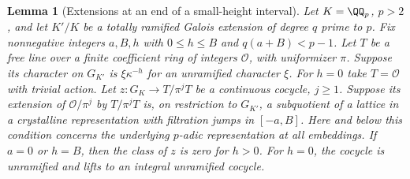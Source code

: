 \documentclass[a4paper,11pt]{article}
\newtheorem{lemma}[proposition]{Lemma}
\theoremstyle{definition}
\theoremstyle{remark}
\numberwithin{equation}{section}
\begin{document}
\begin{lemma}[Extensions at an end of a small-height interval]
\leavevmode\label{lem:tameends743}
Let \(K=\QQ_p\), \(p>2\), and let \(K'/K\) be a totally ramified
Galois extension of degree \(q\) prime to \(p\). Fix nonnegative
integers \(a,B,h\) with \(0\le h\le B\) and \(q(a+B)<p-1\).
Let \(T\) be a free line over a finite coefficient ring of integers
\(\mathcal O\), with uniformizer \(\pi\). Suppose its character
on \(G_{K'}\) is \(\xi\kappa^{-h}\) for an unramified character
\(\xi\). For \(h=0\) take \(T=\mathcal O\) with trivial action.
Let \(z:G_K\to T/\pi^jT\) be a continuous cocycle, \(j\ge1\).
Suppose its extension of \(\mathcal O/\pi^j\) by \(T/\pi^jT\)
is, on restriction to \(G_{K'}\), a subquotient of a lattice in
a crystalline representation with filtration jumps in \([-a,B]\).
Here and below this condition concerns the underlying \(p\)-adic
representation at all embeddings. If \(a=0\) or \(h=B\), then
the class of \(z\) is zero for \(h>0\). For \(h=0\), the cocycle
is unramified and lifts to an integral unramified cocycle.
\end{lemma}
\end{document}
